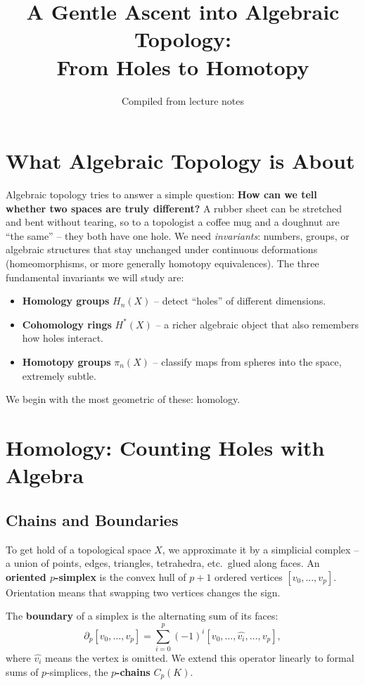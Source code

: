 \documentclass{article}
\title{A Gentle Ascent into Algebraic Topology:\\From Holes to Homotopy}
\author{Compiled from lecture notes}
\date{}
\theoremstyle{definition}
\begin{document}
\maketitle
\tableofcontents

\section{What Algebraic Topology is About}
Algebraic topology tries to answer a simple question: \textbf{How can we tell whether two spaces are truly different?} 
A rubber sheet can be stretched and bent without tearing, so to a topologist a coffee mug and a doughnut are “the same” – they both have one hole.
We need \emph{invariants}: numbers, groups, or algebraic structures that stay unchanged under continuous deformations (homeomorphisms, or more generally homotopy equivalences).
The three fundamental invariants we will study are:

\begin{itemize}
    \item \textbf{Homology groups} $H_n(X)$ – detect “holes” of different dimensions.
    \item \textbf{Cohomology rings} $H^*(X)$ – a richer algebraic object that also remembers how holes interact.
    \item \textbf{Homotopy groups} $\pi_n(X)$ – classify maps from spheres into the space, extremely subtle.
\end{itemize}

We begin with the most geometric of these: homology.

\section{Homology: Counting Holes with Algebra}

\subsection{Chains and Boundaries}
To get hold of a topological space $X$, we approximate it by a simplicial complex – a union of points, edges, triangles, tetrahedra, etc.\ glued along faces.
An \textbf{oriented $p$-simplex} is the convex hull of $p+1$ ordered vertices $[v_0,\dots,v_p]$.
Orientation means that swapping two vertices changes the sign.

The \textbf{boundary} of a simplex is the alternating sum of its faces:
\[
\partial_p [v_0,\dots,v_p] = \sum_{i=0}^p (-1)^i [v_0,\dots,\widehat{v_i},\dots,v_p],
\]
where $\widehat{v_i}$ means the vertex is omitted.
We extend this operator linearly to formal sums of $p$-simplices, the \textbf{$p$-chains} $C_p(K)$.
\end{document}

